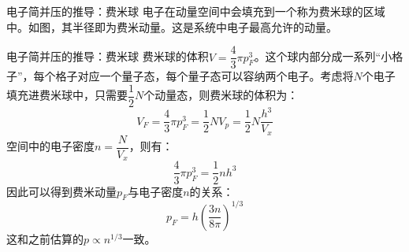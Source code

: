\documentclass[10pt,aspectratio=1610]{beamer}
\begin{document}
\begin{frame}{电子简并压的推导：费米球}
        电子在\textcolor{mari}{动量空间}中会填充到一个称为\textcolor{dia}{费米球}的区域中。如图，其半径即为\textcolor{dia}{费米动量}。这是\textcolor{mari}{系统中电子最高允许的动量}。
        \begin{figure}
            \centering
        \end{figure}
\end{frame}

\begin{frame}{电子简并压的推导：费米球}
    费米球的体积$V = \dfrac{4}{3}\pi p_F^3$。这个球内部分成一系列“小格子”，每个格子对应一个量子态，每个量子态可以容纳两个电子。考虑将$N$个电子填充进费米球中，只需要$\dfrac{1}{2}N$个动量态，则费米球的体积为：
    \textcolor{mari}{
    \[
        V_F = \frac{4}{3}\pi p_F^3 = \frac{1}{2}N V_p = \frac{1}{2}N \frac{h^3}{V_x}
    \]
    }
    空间中的电子密度$n = \dfrac{N}{V_x}$，则有：
    \[
        \frac{4}{3}\pi p_F^3 = \frac{1}{2}n h^3
    \]
    因此可以得到费米动量$p_F$与电子密度$n$的关系：
    \textcolor{dia}{
    \[
        p_F = h \left(\frac{3n}{8\pi}\right)^{1/3}
    \]
    }
    \textcolor{mari}{这和之前估算的$p \propto n^{1/3}$一致。}
\end{frame}
\end{document}
